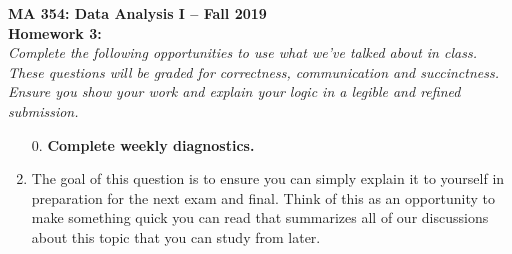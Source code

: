 \documentclass{article}
\begin{document}

\noindent \textbf{MA 354: Data Analysis I -- Fall 2019}\\%
\noindent \textbf{Homework 3:}\vspace{1em}\\
\emph{Complete the following opportunities to use what we've talked about in class. 
These questions will be graded for correctness, communication and succinctness. Ensure
you show your work and explain your logic in a legible and refined submission.}\\

\begin{enumerate}
\item[0.] \textbf{Complete weekly diagnostics.}

\item  The goal of this question is to ensure you can simply explain it to yourself in preparation
for the next exam and final. Think of this as an opportunity to make something 
quick you can read that summarizes all of our discussions about this topic
that you can study from later.


\end{enumerate}
\end{document}
